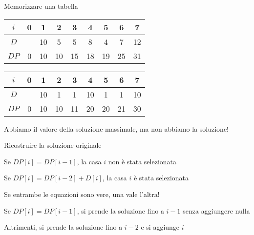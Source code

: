 \begin{frame}{Memorizzare una tabella}

\vspace{-9pt}
\begin{myboxtitle}[Esempi]
\begin{center}
\medskip
\begin{tabular}{|c|c|c|c|c|c|c|c|c|}
\hline
$i$ & 0 & 1 & 2 & 3 & 4 & 5 & 6 & 7 \\\hline
$D$ &   & 10 & 5 & 5 & 8 & 4 & 7 & 12 \\\hline
$\mathit{DP}$ & 0 & 10 & 10 & 15 & 18 & 19 & 25 & 31 \\\hline
\end{tabular}

\medskip
\begin{tabular}{|c|c|c|c|c|c|c|c|c|}
\hline
$i$ & 0 & 1 & 2 & 3 & 4 & 5 & 6 & 7 \\\hline
$D$ &   & 10 & 1 & 1 & 10 & 1 & 1 & 10 \\\hline
$\mathit{DP}$ & 0 & 10 & 10 & 11 & 20 & 20 & 21 & 30 \\\hline
\end{tabular}
\end{center}
\end{myboxtitle}

\begin{myboxtitle}[Problema]
Abbiamo il valore della soluzione massimale, ma non abbiamo
la soluzione!
\end{myboxtitle}

\end{frame}

\begin{frame}[fragile]{Ricostruire la soluzione originale}

\vspace{-9pt}
  \BIL
  \item Se \alert{$\mathit{DP}[i] = \mathit{DP}[i-1]$}, la casa $i$ \alert{non è stata selezionata}
  \item Se \alert{$\mathit{DP}[i] = \mathit{DP}[i-2]+D[i]$}, la casa $i$ \alert{è stata selezionata}
  \item Se entrambe le equazioni sono vere, una vale l'altra!
  \EIL
  
\medskip
{}
  \BIL
  \item Se \alert{$\mathit{DP}[i] = \mathit{DP}[i-1]$}, si prende la soluzione fino a $i-1$ \alert{senza aggiungere nulla}
  \item \alert{Altrimenti}, si prende la soluzione fino a $i-2$ e \alert{si aggiunge $i$}
  \EIL

\end{frame}


